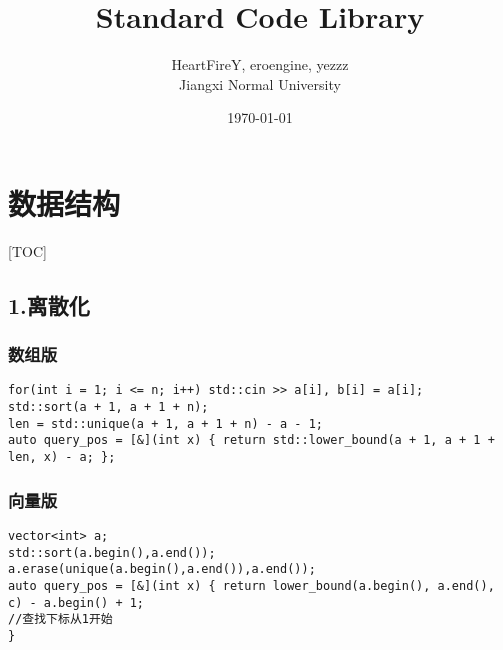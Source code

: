 \documentclass[]{article}
\date{}
\title{\vspace{50mm} \huge Standard Code Library \\[20pt]}
\author{HeartFireY, eroengine, yezzz \\[10pt] Jiangxi Normal University}
\date{\today}
\begin{document}
\begin{titlepage}

\maketitle

\end{titlepage}

\newpage

\renewcommand\labelitemi{$\bullet$}

{
\setcounter{tocdepth}{3}
\tableofcontents
\newpage
}








\hypertarget{ux6570ux636eux7ed3ux6784}{%
\section{数据结构}\label{ux6570ux636eux7ed3ux6784}}

{[}TOC{]}

\hypertarget{ux79bbux6563ux5316}{%
\subsection{1.离散化}\label{ux79bbux6563ux5316}}

\hypertarget{ux6570ux7ec4ux7248}{%
\subsubsection{数组版}\label{ux6570ux7ec4ux7248}}

\begin{verbatim}
for(int i = 1; i <= n; i++) std::cin >> a[i], b[i] = a[i];
std::sort(a + 1, a + 1 + n);
len = std::unique(a + 1, a + 1 + n) - a - 1;
auto query_pos = [&](int x) { return std::lower_bound(a + 1, a + 1 + len, x) - a; };
\end{verbatim}

\hypertarget{ux5411ux91cfux7248}{%
\subsubsection{向量版}\label{ux5411ux91cfux7248}}

\begin{verbatim}
vector<int> a;
std::sort(a.begin(),a.end());
a.erase(unique(a.begin(),a.end()),a.end());
auto query_pos = [&](int x) { return lower_bound(a.begin(), a.end(), c) - a.begin() + 1;  
//查找下标从1开始
}
\end{verbatim}
\end{document}
